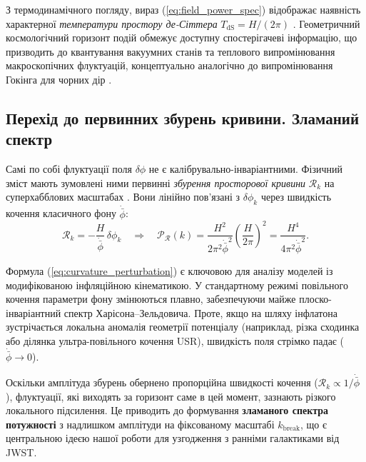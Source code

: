\documentclass[12pt, a4paper]{article}
\begin{document}
З термодинамічного погляду, вираз (\ref{eq:field_power_spec}) відображає наявність характерної \emph{температури простору де-Сіттера} $T_\mathrm{dS} = H/(2\pi)$ \cite{gibbons_hawking_1977}. Геометричний космологічний горизонт подій обмежує доступну спостерігачеві інформацію, що призводить до квантування вакуумних станів та теплового випромінювання макроскопічних флуктуацій, концептуально аналогічно до випромінювання Гокінга для чорних дір \cite{hawking_1975}.

\subsection{Перехід до первинних збурень кривини. Зламаний спектр}

Самі по собі флуктуації поля $\delta\phi$ не є калібрувально-інваріантними. Фізичний зміст мають зумовлені ними первинні \emph{збурення просторової кривини} $\mathcal{R}_k$ на суперхабблових масштабах \cite{bardeen_1980}. Вони лінійно пов'язані з $\delta\phi_k$ через швидкість кочення класичного фону $\dot{\bar{\phi}}$:
\begin{equation}\label{eq:curvature_perturbation}
  \mathcal{R}_k = - \frac{H}{\dot{\bar{\phi}}}\,\delta\phi_k \quad \Rightarrow \quad \mathcal{P}_{\mathcal{R}}(k) = \frac{H^2}{2\pi^2 \dot{\bar{\phi}}^2} \left(\frac{H}{2\pi}\right)^2 = \frac{H^4}{4\pi^2 \dot{\bar{\phi}}^2}.
\end{equation}

Формула (\ref{eq:curvature_perturbation}) є ключовою для аналізу моделей із модифікованою інфляційною кінематикою. У стандартному режимі повільного кочення параметри фону змінюються плавно, забезпечуючи майже плоско-інваріантний спектр Харісона--Зельдовича. Проте, якщо на шляху інфлатона зустрічається локальна аномалія геометрії потенціалу (наприклад, різка сходинка або ділянка ультра-повільного кочення USR), швидкість поля стрімко падає ($\dot{\bar{\phi}} \to 0$).

Оскільки амплітуда збурень обернено пропорційна швидкості кочення ($\mathcal{R}_k \propto 1/\dot{\bar{\phi}}$), флуктуації, які виходять за горизонт саме в цей момент, зазнають різкого локального підсилення. Це приводить до формування \textbf{зламаного спектра потужності} з надлишком амплітуди на фіксованому масштабі $k_\mathrm{break}$, що є центральною ідеєю нашої роботи для узгодження з ранніми галактиками від JWST.
\end{document}
